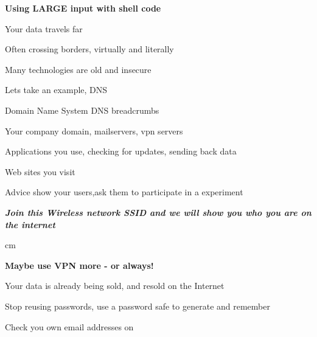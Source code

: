 \documentclass[Screen16to9,17pt,footrule]{foils}
\begin{document}
\centerline{\bf\Large Using LARGE input with shell code}



\begin{list2}
\item Your data travels far
\item Often crossing borders, virtually and literally
\item Many technologies are old and insecure
\end{list2}



\begin{list1}
\item Lets take an example, DNS
\item Domain Name System DNS breadcrumbs
\begin{list2}
\item Your company domain, mailservers, vpn servers
\item Applications you use, checking for updates, sending back data
\item Web sites you visit
\end{list2}
\vskip 1cm
\item Advice show your users,ask them to participate in a experiment
\end{list1}

\emph{\bf Join this Wireless network SSID and we will show you who you are on the internet}

 cm
\centerline{\bf\Large Maybe use VPN more - or always!}



\begin{list1}
\item Your data is already being sold, and resold on the Internet
\item Stop reusing passwords, use a password safe to generate and remember
\item Check you own email addresses on 
\end{list1}


{~}
\end{document}

